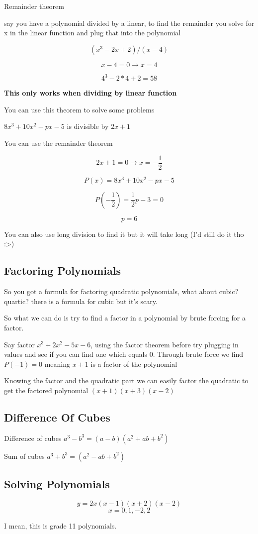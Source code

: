 \documentclass[../main.tex]{subfiles}
\begin{document}
\noindent Remainder theorem

say you have a polynomial divided by a linear, to find the remainder you solve for x in the linear function and plug that into the polynomial

$$(x^3-2x+2)/(x-4)$$

$$x-4=0 \rightarrow x=4$$

$$4^3-2*4+2=58$$

\textbf{This only works when dividing by linear function}

\noindent You can use this theorem to solve some problems 

$8x^3+10x^2-px-5$ is divisible by $2x+1$

You can use the remainder theorem 

$$2x+1=0 \rightarrow x=-\frac{1}{2}$$

$$P(x)=8x^3+10x^2-px-5$$

$$P(-\frac{1}{2})=\frac{1}{2}p-3=0$$

$$p=6$$

You can also use long division to find it but it will take long (I'd still do it tho :>)

\subsection{Factoring Polynomials}

So you got a formula for factoring quadratic polynomials, what about cubic? quartic? there is a formula for cubic but it's scary.

So what we can do is try to find a factor in a polynomial by brute forcing for a factor.

Say factor $x^3+2x^2-5x-6$, using the factor theorem before try plugging in values and see if you can find one which equals $0$. Through brute force we find $P(-1)=0$ meaning $x+1$ is a factor of the polynomial


Knowing the factor and the quadratic part we can easily factor the quadratic to get the factored polynomial $(x+1)(x+3)(x-2)$

\subsection{Difference Of Cubes}

Difference of cubes $a^3-b^3=(a-b)(a^2+ab+b^2)$

\noindent Sum of cubes $a^3+b^3=(a^2-ab+b^2)$

\subsection{Solving Polynomials}

$$y=2x(x-1)(x+2)(x-2)$$
$$x=0,1,-2,2$$

I mean, this is grade 11 polynomials.
\end{document}
